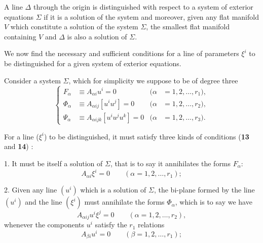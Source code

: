 \begin{dfn*}
  A line $\Delta$ through the origin is  distinguished with respect to a system of exterior equations $\Sigma$ if it is a solution of the system and moreover, given any flat manifold $V$ which constitute a solution of the system $\Sigma$, the smallest flat manifold containing $V$ and $\Delta$ is also a solution of $\Sigma$.
\end{dfn*}

We now find the necessary and sufficient conditions for a line of parameters $\xi^{i}$ to be distinguished for a given system of exterior equations.

Consider a system $\Sigma$, which for simplicity we suppose to be of degree three
\begin{equation}
  \label{eq:18}
  \left\{
    \begin{aligned}
      F_{\alpha}&\equiv A_{\alpha i}u^{i}=0&(\alpha&=1,2,\dots,r_{1}),\\
      \Phi_{\alpha}&\equiv A_{\alpha ij}[u^{i}u^{j}]=0&(\alpha&=1,2,\dots,r_{2}),\\
      \Psi_{\alpha}&\equiv A_{\alpha ijk}[u^{i}u^{j}u^{k}]=0&(\alpha&=1,2,\dots,r_{3}).
    \end{aligned}
  \right.
\end{equation}

For a line ($\xi^{i}$) to be distinguished, it must satisfy three kinds of conditions  (\textsection\textbf{13} and \textsection\textbf{14}) :

1. It must be itself a solution of $\Sigma$, that is to say it annihilates the forms $F_{\alpha}$:
\begin{equation}
\label{eq:19}
A_{\alpha i}\xi^{i}=0\qquad (\alpha=1,2,\dots,r_{1});
\end{equation}

2. Given any line $(u^{i})$ which is a solution of $\Sigma$, the bi-plane formed by the line $(u^{i})$ and the line $(\xi^{i})$ must annihilate the forms $\Phi_{\alpha}$, which is to say we have
\begin{equation}
\label{eq:20}
A_{\alpha ij}u^{i}\xi^{j}=0\qquad(\alpha=1,2,\dots,r_{2}),
\end{equation}
whenever the components $u^{i}$ satisfy the $r_{1}$ relations
\begin{equation}
\label{eq:21}
A_{\beta i}u^{i}=0\qquad (\beta=1,2,\dots,r_{1});
\end{equation} 


